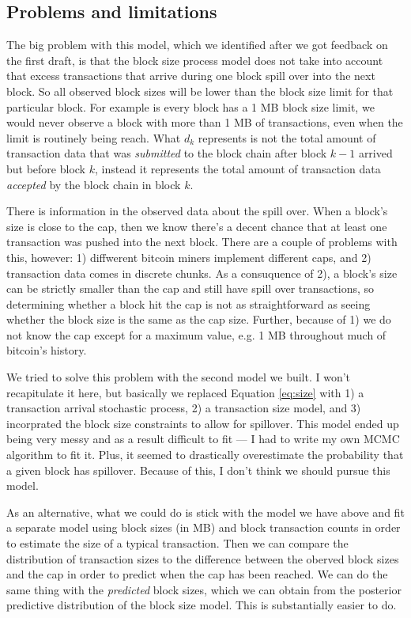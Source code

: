 \documentclass[12pt]{article}
\begin{document}
\subsection{Problems and limitations}
The big problem with this model, which we identified after we got feedback on the first draft, is that the block size process model does not take into account that excess transactions that arrive during one block spill over into the next block. So all observed block sizes will be lower than the block size limit for that particular block. For example is every block has a 1 MB block size limit, we would never observe a block with more than 1 MB of transactions, even when the limit is routinely being reach. What $d_k$ represents is not the total amount of transaction data that was {\it submitted} to the block chain after block $k-1$ arrived but before block $k$, instead it represents the total amount of transaction data {\it accepted} by the block chain in block $k$.

There is information in the observed data about the spill over. When a block's size is close to the cap, then we know there's a decent chance that at least one transaction was pushed into the next block. There are a couple of problems with this, however: 1) diffwerent bitcoin miners implement different caps, and 2) transaction data comes in discrete chunks. As a consuquence of 2), a block's size can be strictly smaller than the cap and still have spill over transactions, so determining whether a block hit the cap is not as straightforward as seeing whether the block size is the same as the cap size. Further, because of 1) we do not know the cap except for a maximum value, e.g. 1 MB throughout much of bitcoin's history.

We tried to solve this problem with the second model we built. I won't recapitulate it here, but basically we replaced Equation \eqref{eq:size} with 1) a transaction arrival stochastic process, 2) a transaction size model, and 3) incorprated the block size constraints to allow for spillover. This model ended up being very messy and as a result difficult to fit --- I had to write my own MCMC algorithm to fit it. Plus, it seemed to drastically overestimate the probability that a given block has spillover. Because of this, I don't think we should pursue this model.

As an alternative, what we could do is stick with the model we have above and fit a separate model using block sizes (in MB) and block transaction counts in order to estimate the size of a typical transaction. Then we can compare the distribution of transaction sizes to the difference between the oberved block sizes and the cap in order to predict when the cap has been reached. We can do the same thing with the {\it predicted} block sizes, which we can obtain from the posterior predictive distribution of the block size model. This is substantially easier to do.
\end{document}
